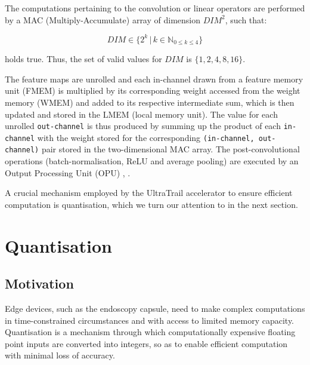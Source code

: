 \documentclass[11pt,a4paper, open=any]{scrbook}
\begin{document}
The computations pertaining to the convolution or linear operators are performed by a MAC (Multiply-Accumulate) array of dimension $DIM^2$, such that: 

\begin{equation}\label{eq_dim}
	DIM \in \{2^k \,|\, k \in \mathbb{N}_{0\leqslant k \leqslant 4} \}
\end{equation}

holds true. Thus, the set of valid values for $DIM$ is $\{1,2,4,8,16\}$.

The feature maps are unrolled and each in-channel drawn from a feature memory unit (FMEM) is multiplied by its corresponding weight accessed from the weight memory (WMEM) and added to its respective intermediate sum, which is then updated and stored in the LMEM (local memory unit). The value for each unrolled \texttt{out-channel} is thus produced by summing up the product of each \texttt{in-channel} with the weight stored for the corresponding \texttt{(in-channel, out-channel)} pair stored in the two-dimensional MAC array. The post-convolutional operations (batch-normalisation, ReLU and average pooling) are executed by an Output Processing Unit (OPU) \cite[6-8]{bernardo20}, . %

A crucial mechanism employed by the UltraTrail accelerator to ensure efficient computation is quantisation, which we turn our attention to in the next section.


\section{Quantisation}\label{sec:quant}
\subsection{Motivation}
Edge devices, such as the endoscopy capsule, need to make complex computations in time-constrained circumstances and with access to limited memory capacity. Quantisation is a mechanism through which computationally expensive floating point inputs are converted into integers, so as to enable efficient computation with minimal loss of accuracy.
\end{document}

